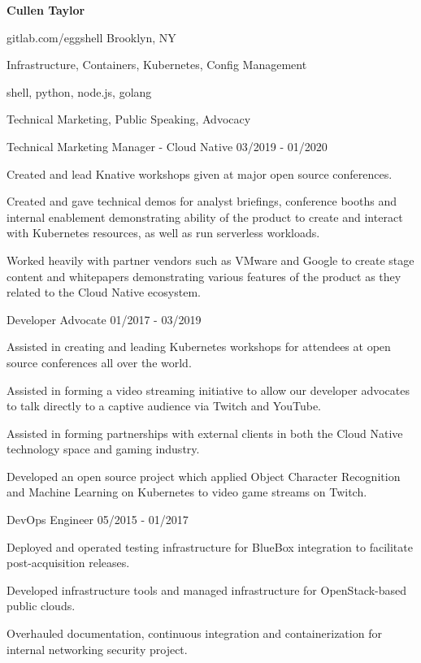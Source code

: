 \documentclass[12pt]{article} %
\begin{document}
\centerline{{\Huge \bf Cullen Taylor}}
\bigskip

        {gitlab.com/eggshell}
        {Brooklyn, NY}
        {}


      {Infrastructure, Containers, Kubernetes, Config Management}

      {shell, python, node.js, golang}

      {Technical Marketing, Public Speaking, Advocacy}


\begin{description}
{}
           {Technical Marketing Manager - Cloud Native}
           {03/2019 - 01/2020}

Created and lead Knative workshops given at major open source conferences.

Created and gave technical demos for analyst briefings, conference booths and
internal enablement demonstrating ability of the product to create and interact
with Kubernetes resources, as well as run serverless workloads.

Worked heavily with partner vendors such as VMware and Google to create stage
content and whitepapers demonstrating various features of the product as they
related to the Cloud Native ecosystem.

           {Developer Advocate}
           {01/2017 - 03/2019}

Assisted in creating and leading Kubernetes workshops for attendees at open
source conferences all over the world.

Assisted in forming a video streaming initiative to allow our developer
advocates to talk directly to a captive audience via Twitch and YouTube.

Assisted in forming partnerships with external clients in both the Cloud Native
technology space and gaming industry.

Developed an open source project which applied Object Character Recognition
and Machine Learning on Kubernetes to video game streams on Twitch.

           {DevOps Engineer}
           {05/2015 - 01/2017}

Deployed and operated testing infrastructure for BlueBox integration to
facilitate post-acquisition releases.

Developed infrastructure tools and managed infrastructure for OpenStack-based
public clouds.

Overhauled documentation, continuous integration and containerization for
internal networking security project.
\end{description}
\end{document}

